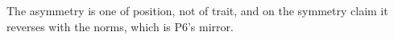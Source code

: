The asymmetry is one of position, not of trait, and on the symmetry claim it reverses with the norms, which is P6's mirror.


